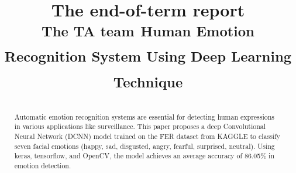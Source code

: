\documentclass[conference]{IEEEtran}
\begin{document}
\title{The end-of-term report\\
{\bigsize \textsuperscript{The TA team }}
{\bigsize \textsuperscript{Human Emotion Recognition System Using Deep 
Learning Technique }}
}

\author{
\and
{}
\and
{}
\and
{}
\and
{}
\and
{}
}
\maketitle

\begin{abstract}
Automatic emotion recognition systems are essential for detecting human expressions in various applications like surveillance. This paper proposes a deep Convolutional Neural Network (DCNN) model trained on the FER dataset from KAGGLE to classify seven facial emotions (happy, sad, disgusted, angry, fearful, surprised, neutral). Using keras, tensorflow, and OpenCV, the model achieves an average accuracy of 86.05\% in emotion detection.
\end{abstract}
\end{document}
